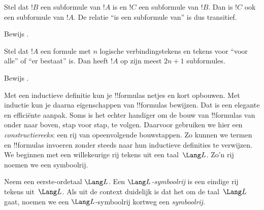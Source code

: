 \documentclass[openany]{memoir}
\begin{document}
\begin{prop}
Stel dat $!B$ een subformule van $!A$ is en $!C$ een subformule van
$!B$. Dan is $!C$ ook een subformule van $!A$. De relatie ``is een
subformule van'' is dus transitief.
\end{prop}

\begin{prob}
Bewijs .
\end{prob}

\begin{prop}
Stel dat $!A$ een formule met $n$ logische verbindingstekens en tekens
voor ``voor alle'' of ``er bestaat'' is. Dan heeft $!A$ op zijn meest
$2n+1$ subformules.
\end{prop}

\begin{prob}
Bewijs .
\end{prob}
\endgroup

\begingroup
\def\olfilename{OLP-0156}
\def\olfilepath{content/first-order-logic/syntax-and-semantics/}
\hypertarget{unit-OLP-0156}{}





Met een inductieve definitie kun je !!{formula}s netjes en kort
opbouwen. Met inductie kun je daarna eigenschappen van !!{formula}s
bewijzen. Dat is een elegante en efficiënte aanpak. Soms is het echter
handiger om de bouw van !!{formula}s van onder naar boven, stap voor
stap, te volgen. Daarvoor gebruiken we hier een
\emph{constructiereeks}: een rij van opeenvolgende bouwstappen.
%
Zo kunnen we termen en !!{formula}s invoeren zonder steeds naar hun
inductieve definities te verwijzen. We beginnen met een willekeurige rij
tekens uit een taal~$\Lang L$. Zo'n rij noemen we een symboolrij.

\begin{defn}
Neem een eerste-ordetaal $\Lang L$. Een \emph{$\Lang L$-symboolrij} is
een eindige rij tekens uit~$\Lang L$. Als uit de context duidelijk is
dat het om de taal~$\Lang L$ gaat, noemen we een
$\Lang L$-symboolrij kortweg een \emph{symboolrij}.
\end{defn}
\end{document}
